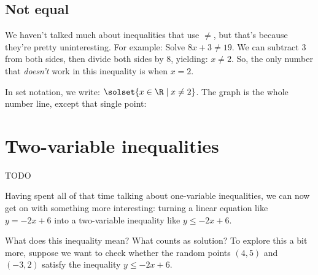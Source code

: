 \subsection{Not equal}

We haven't talked much about inequalities that use $\neq$, but that's because they're pretty uninteresting. For example: Solve $8x + 3 \neq 19$. We can subtract 3 from both sides, then divide both sides by 8, yielding: $x \neq 2$. So, the only number that \textit{doesn't} work in this inequality is when $x=2$.

In set notation, we write: $\solset{ x \in \R \mid x \neq 2}$. The graph is the whole number line, except that single point:
\begin{center}
\end{center}

\section{Two-variable inequalities}
\label{sec:ineqtwovar}

\begin{boxedexplore}
TODO
\end{boxedexplore}

Having spent all of that time talking about one-variable inequalities, we can now get on with something more interesting: turning a linear equation like $y = -2x + 6$ into a two-variable inequality like $y \leq -2x + 6$.

What does this inequality mean? What counts as solution? To explore this a bit more, suppose we want to check whether the random points $(4,5)$ and $(-3,2)$ satisfy the inequality $y \leq -2x + 6$.

